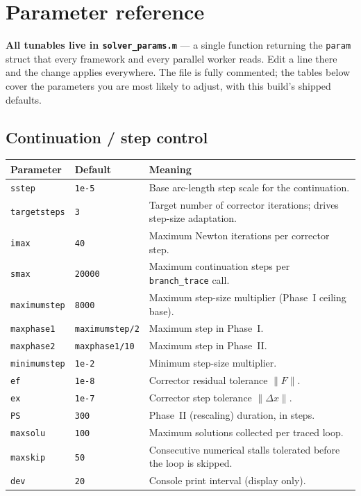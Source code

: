\documentclass[11pt,a4paper]{article}
\newcommand{\code}[1]{\texttt{#1}}
\begin{document}
\section{Parameter reference}\label{sec:params}

\textbf{All tunables live in \code{solver_params.m}} --- a single function returning the
\code{param} struct that every framework and every parallel worker reads. Edit a line
there and the change applies everywhere. The file is fully commented; the tables below
cover the parameters you are most likely to adjust, with this build's shipped defaults.

\subsection{Continuation / step control}
\begin{center}\small
\begin{longtable}{@{}p{}p{}p{}@{}}
\toprule
\textbf{Parameter} & \textbf{Default} & \textbf{Meaning}\\
\midrule\endhead
\code{sstep}        & \code{1e-5} & Base arc-length step scale for the continuation.\\
\code{targetsteps}  & \code{3}    & Target number of corrector iterations; drives step-size adaptation.\\
\code{imax}         & \code{40}   & Maximum Newton iterations per corrector step.\\
\code{smax}         & \code{20000}& Maximum continuation steps per \code{branch_trace} call.\\
\code{maximumstep}  & \code{8000} & Maximum step-size multiplier (Phase~I ceiling base).\\
\code{maxphase1}    & \code{maximumstep/2} & Maximum step in Phase~I.\\
\code{maxphase2}    & \code{maxphase1/10}  & Maximum step in Phase~II.\\
\code{minimumstep}  & \code{1e-2} & Minimum step-size multiplier.\\
\code{ef}           & \code{1e-8} & Corrector residual tolerance $\lVert F\rVert$.\\
\code{ex}           & \code{1e-7} & Corrector step tolerance $\lVert \Delta x\rVert$.\\
\code{PS}           & \code{300}  & Phase~II (rescaling) duration, in steps.\\
\code{maxsolu}      & \code{100}  & Maximum solutions collected per traced loop.\\
\code{maxskip}      & \code{50}   & Consecutive numerical stalls tolerated before the loop is skipped.\\
\code{dev}          & \code{20}   & Console print interval (display only).\\
\bottomrule
\end{longtable}
\end{center}
\end{document}
